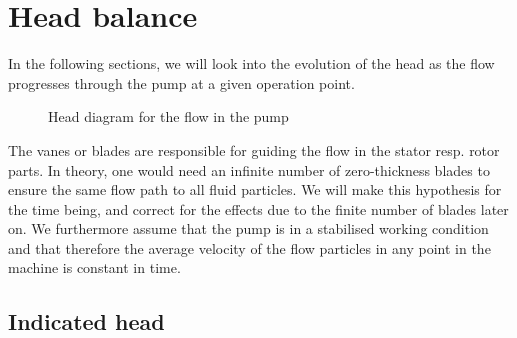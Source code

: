 \section{Head balance}
\label{sec:pumps:head}

In the following sections, we will look into the evolution of the head
as the flow progresses through the pump at a given operation point.
\begin{figure}[!h]
  \centering{}
  \caption{Head diagram for the flow in the pump}
  \label{fig:headDiagramPump}
\end{figure}

The vanes or blades are responsible for guiding the flow in the stator
resp. rotor parts. In theory, one would need an infinite number of
zero-thickness blades to ensure the same flow path to all fluid
particles. We will make this hypothesis for the time being, and
correct for the effects due to the finite number of blades later on.
We furthermore assume that the pump is in a stabilised working
condition and that therefore the average velocity of the flow
particles in any point in the machine is constant in time.

\subsection{Indicated head}

